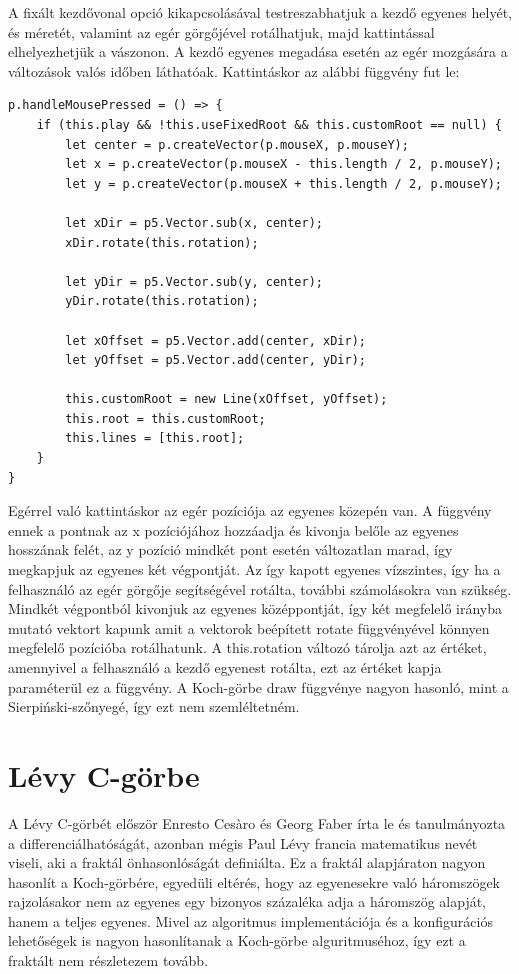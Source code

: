A fixált kezdővonal opció kikapcsolásával testreszabhatjuk a kezdő egyenes helyét, és méretét, valamint az egér görgőjével rotálhatjuk, majd kattintással elhelyezhetjük a vászonon. A kezdő egyenes megadása esetén az egér mozgására a változások valós időben láthatóak. Kattintáskor az alábbi függvény fut le:
\begin{lstlisting}
p.handleMousePressed = () => {
	if (this.play && !this.useFixedRoot && this.customRoot == null) {
		let center = p.createVector(p.mouseX, p.mouseY);
		let x = p.createVector(p.mouseX - this.length / 2, p.mouseY);
		let y = p.createVector(p.mouseX + this.length / 2, p.mouseY);
		
		let xDir = p5.Vector.sub(x, center);
		xDir.rotate(this.rotation);
		
		let yDir = p5.Vector.sub(y, center);
		yDir.rotate(this.rotation);
		
		let xOffset = p5.Vector.add(center, xDir);
		let yOffset = p5.Vector.add(center, yDir);
		
		this.customRoot = new Line(xOffset, yOffset);
		this.root = this.customRoot;
		this.lines = [this.root];
	}
}
\end{lstlisting}
Egérrel való kattintáskor az egér pozíciója az egyenes közepén van. A függvény ennek a pontnak az x pozíciójához hozzáadja és kivonja belőle az egyenes hosszának felét, az y pozíció mindkét pont esetén változatlan marad, így megkapjuk az egyenes két végpontját. Az így kapott egyenes vízszintes, így ha a felhasználó az egér görgője segítségével rotálta, további számolásokra van szükség. Mindkét végpontból kivonjuk az egyenes középpontját, így két megfelelő irányba mutató vektort kapunk amit a vektorok beépített rotate függvényével könnyen megfelelő pozícióba rotálhatunk. A this.rotation változó tárolja azt az értéket, amennyivel a felhasználó a kezdő egyenest rotálta, ezt az értéket kapja paraméterül ez a függvény. A Koch-görbe draw függvénye nagyon hasonló, mint a Sierpiński-szőnyegé, így ezt nem szemléltetném.
\section*{Lévy C-görbe}
A Lévy C-görbét először Enresto Cesàro és Georg Faber írta le és tanulmányozta a differenciálhatóságát, azonban mégis Paul Lévy francia matematikus nevét viseli, aki a fraktál önhasonlóságát definiálta. Ez a fraktál alapjáraton nagyon hasonlít a Koch-görbére, egyedüli eltérés, hogy az egyenesekre való háromszögek rajzolásakor nem az egyenes egy bizonyos százaléka adja a háromszög alapját, hanem a teljes egyenes. Mivel az algoritmus implementációja és a konfigurációs lehetőségek is nagyon hasonlítanak a Koch-görbe alguritmuséhoz, így ezt a fraktált nem részletezem tovább.
